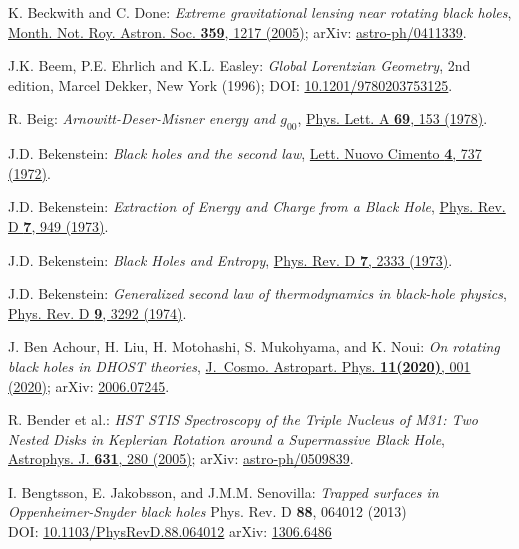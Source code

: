 \begin{thebibliography}{123}
K. Beckwith and C. Done:
{\em Extreme gravitational lensing near rotating black holes},
\href{https://doi.org/10.1111/j.1365-2966.2005.08980.x}{Month. Not. Roy. Astron. Soc. {\bf 359}, 1217 (2005)};
arXiv: \href{https://arxiv.org/abs/astro-ph/0411339}{astro-ph/0411339}.

J.K. Beem, P.E. Ehrlich and K.L. Easley:
{\em Global Lorentzian Geometry}, 2nd edition,
Marcel Dekker, New York (1996);
DOI: \href{https://doi.org/10.1201/9780203753125}{10.1201/9780203753125}.

R. Beig:
{\em Arnowitt-Deser-Misner energy and $g_{00}$},
\href{https://doi.org/10.1016/0375-9601(78)90198-6}{Phys. Lett. A {\bf 69}, 153 (1978)}.

J.D. Bekenstein:
{\em Black holes and the second law},
\href{https://doi.org/10.1007/BF02757029}{Lett. Nuovo Cimento {\bf 4}, 737 (1972)}.

J.D. Bekenstein:
{\em Extraction of Energy and Charge from a Black Hole},
\href{https://doi.org/10.1103/PhysRevD.7.949}{Phys. Rev. D {\bf 7}, 949 (1973)}.

J.D. Bekenstein:
{\em Black Holes and Entropy},
\href{https://doi.org/10.1103/PhysRevD.7.2333}{Phys. Rev. D {\bf 7}, 2333 (1973)}.

J.D. Bekenstein:
{\em Generalized second law of thermodynamics in black-hole physics},
\href{https://doi.org/10.1103/PhysRevD.9.3292}{Phys. Rev. D {\bf 9}, 3292 (1974)}.

J. Ben Achour, H. Liu, H. Motohashi, S. Mukohyama, and K. Noui:
{\em On rotating black holes in DHOST theories},
\href{https://doi.org/10.1088/1475-7516/2020/11/001}{J.~Cosmo. Astropart. Phys. {\bf 11(2020)}, 001 (2020)};
arXiv: \href{https://arxiv.org/abs/2006.07245}{2006.07245}.

R. Bender et al.:
{\em HST STIS Spectroscopy of the Triple Nucleus of M31: Two Nested Disks in Keplerian Rotation around a Supermassive Black Hole},
\href{https://doi.org/10.1086/432434}{Astrophys. J. {\bf 631}, 280 (2005)};
arXiv: \href{https://arxiv.org/abs/astro-ph/0509839}{astro-ph/0509839}.

I. Bengtsson, E. Jakobsson, and J.M.M. Senovilla:
{\em Trapped surfaces in Oppenheimer-Snyder black holes}
Phys. Rev. D {\bf 88}, 064012 (2013)\\
DOI: \href{https://doi.org/10.1103/PhysRevD.88.064012}{10.1103/PhysRevD.88.064012}\hfill
arXiv: \href{https://arxiv.org/abs/1306.6486}{1306.6486}


\end{thebibliography}
